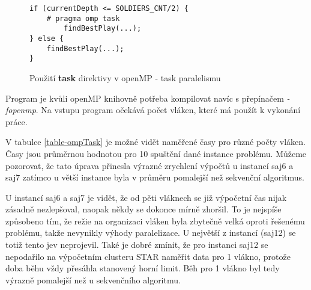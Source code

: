 \documentclass{article} \oddsidemargin=-5mm
\begin{document}
\begin{figure}[h]
\centering
\begin{BVerbatim}
if (currentDepth <= SOLDIERS_CNT/2) {
    # pragma omp task
        findBestPlay(...);
} else {
    findBestPlay(...);
}
\end{BVerbatim}
\caption{Použití \textbf{task} direktivy v openMP - task paralelismu}
\label{ompTask-3}
\end{figure}

Program je kvůli openMP knihovně potřeba kompilovat navíc s přepínačem \textit{-fopenmp}. Na vstupu program očekává počet vláken, které má použít k vykonání práce.

V tabulce \ref{table-ompTask} je možné vidět naměřené časy pro různé počty vláken. Časy jsou průměrnou hodnotou pro 10 spuštění dané instance problému. Můžeme pozorovat, že tato úprava přinesla výrazné zrychlení výpočtů u instancí saj6 a saj7 zatímco u větší instance byla v průměru pomalejší než sekvenční algoritmus.

U instancí saj6 a saj7 je vidět, že od pěti vláknech se již výpočetní čas nijak zásadně nezlepšoval, naopak někdy se dokonce mírně zhoršil. To je nejspíše způsobeno tím, že režie na organizaci vláken byla zbytečně velká oproti řešenému problému, takže nevynikly výhody paralelizace. U největší z instancí (saj12) se totiž tento jev neprojevil. Také je dobré zmínit, že pro instanci saj12 se nepodařilo na výpočetním clusteru STAR naměřit data pro 1 vlákno, protože doba běhu vždy přesáhla stanovený horní limit. Běh pro 1 vlákno byl tedy výrazně pomalejší než u sekvenčního algoritmu.
\end{document}
